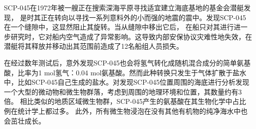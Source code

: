 SCP-045在1972年被一艘正在搜索深海平原寻找适宜建立海底基地的基金会潜艇发现， 是时其正在转向以寻找一系列意料外的小而强的地震的震中。发现SCP-045在一个缝隙中，这显然阻止其旋转。当从缝隙中移出它后， 在船只对其进行进一步研究时，它对船内空气造成了异常影响。这导致内部安保协议灾难性地失效，在潜艇将其释放并移动出其范围前造成了12名船组人员损失。

在经过数年测试后，意外发现SCP-045也会将氢气转化成随机混合成分的简单氨基酸，比率为1 mol氢气：0.04 mol氨基酸。然而此种转换只发生于气体扩散于盐水中，比如SCP-045自己生成的盐水。对发现SCP-045位置周围的海底进行分析发现一个大型的微动物和微生物群落，考虑到周围的地理环境和位置，其数量约有3倍。 相比类似的地质区域微生物群，SCP-045产生的氨基酸在其生物化学中占比例在统计学上都过多。 此外，所有微生物浸泡在没有其他有机物的纯净海水中也会茁壮成长。
